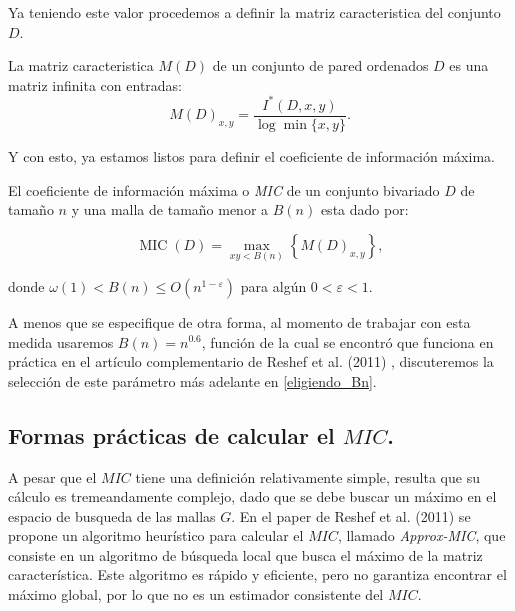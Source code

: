         Ya teniendo este valor procedemos a definir la matriz caracteristica del conjunto $D$.
    
        \begin{defn}
            La matriz caracteristica $M(D)$ de un conjunto de pared ordenados $D$ es una matriz infinita con entradas:
            $$
            M(D)_{x, y}=\frac{I^{*}(D, x, y)}{\log \min \{x, y\}}.
            $$
        \end{defn}

        Y con esto, ya estamos listos para definir el coeficiente de informaci\'on m\'axima.

        \begin{defn}
            El coeficiente de informaci\'on m\'axima o \textit{MIC} de un conjunto bivariado $D$ de tama\~no $n$ y una malla de tama\~no menor a $B(n)$ esta dado por:
    
            $$
            \operatorname{MIC}(D)=\max _{x y<B(n)}\left\{M(D)_{x, y}\right\},
            $$
    
            donde $\omega(1)<B(n) \leq O\left(n^{1-\varepsilon}\right)$ para alg\'un $0<\varepsilon<1$.
        \end{defn}
        \begin{rem}
            A menos que se especifique de otra forma, al momento de trabajar con esta medida usaremos $B(n)=n^{0.6}$, funci\'on de la cual se encontr\'o que funciona en pr\'actica en el art\'iculo complementario de Reshef et al. (2011) \cite[]{Reshef2011}, discuteremos la selecci\'on de este par\'ametro m\'as adelante en \ref{eligiendo_Bn}.
        \end{rem}
    
    
        \subsection[Formas practicas de calcular el MIC.]{Formas pr\'acticas de calcular el $MIC$.}

        A pesar que el $MIC$ tiene una definici\'on relativamente simple, resulta que su c\'alculo es tremeandamente complejo, dado que se debe buscar un m\'aximo en el espacio de busqueda de las mallas $G$. En el paper de Reshef et al. (2011) \cite{Reshef2011} se propone un algoritmo heur\'istico para calcular el $MIC$, llamado \textit{Approx-MIC}, que consiste en un algoritmo de b\'usqueda local que busca el m\'aximo de la matriz caracter\'istica. Este algoritmo es r\'apido y eficiente, pero no garantiza encontrar el m\'aximo global, por lo que no es un estimador consistente del $MIC$.
    
